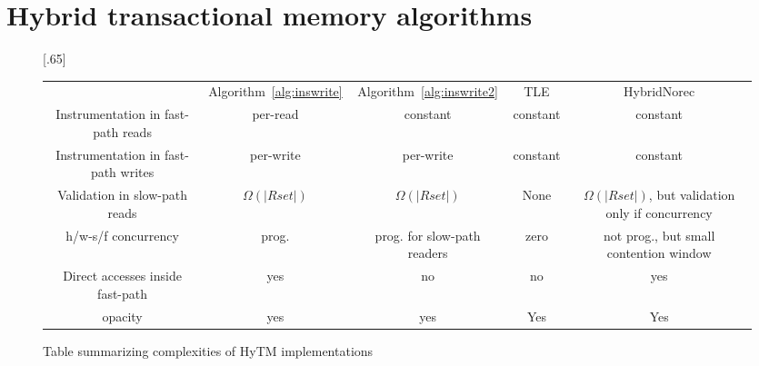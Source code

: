 \section{Hybrid transactional memory algorithms}\label{sec:hytmalgos}
%
\begin{figure*}[!t]
      
     \scalebox{.65}[.65]{
     \begin{tabularx}{\textwidth}{c|c|c|c|c}
	~~~~~ & Algorithm~\ref{alg:inswrite} & Algorithm~\ref{alg:inswrite2} & TLE & HybridNorec\\ 
	Instrumentation in fast-path reads & per-read & constant & constant & constant \\ 
	Instrumentation in fast-path writes & per-write & per-write & constant & constant \\ 
	Validation in slow-path reads & $\Omega(|Rset|)$ & $\Omega(|Rset|)$ & None & $\Omega(|Rset|)$, but validation only if concurrency \\ 
	h/w-s/f concurrency & prog. & prog. for slow-path readers & zero & not prog., but small contention window \\ 
	Direct accesses inside fast-path & yes & no & no & yes \\ 
	opacity & yes & yes & Yes & Yes 
   \end{tabularx}
\caption{Table summarizing complexities of HyTM implementations}\label{fig:main}    
}
\end{figure*}
%

%
%